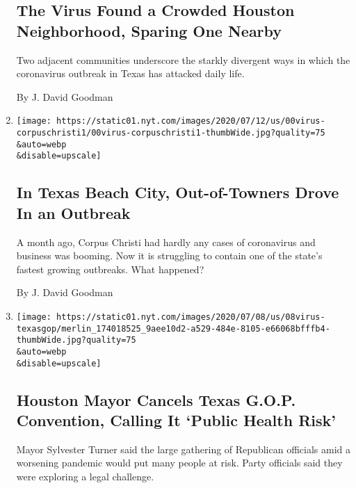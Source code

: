 \begin{enumerate}
  \hypertarget{the-virus-found-a-crowded-houston-neighborhood-sparing-one-nearby}{%
  \subsection{The Virus Found a Crowded Houston Neighborhood, Sparing
  One
  Nearby}\label{the-virus-found-a-crowded-houston-neighborhood-sparing-one-nearby}}

  Two adjacent communities underscore the starkly divergent ways in
  which the coronavirus outbreak in Texas has attacked daily life.

  By J. David Goodman
\item
  \href{/2020/07/11/us/coronavirus-texas-corpus-christi.html}{}

  \texttt{[image: https://static01.nyt.com/images/2020/07/12/us/00virus-corpuschristi1/00virus-corpuschristi1-thumbWide.jpg?quality=75\\\&auto=webp\\\&disable=upscale]}

  \hypertarget{in-texas-beach-city-out-of-towners-drove-in-an-outbreak}{%
  \subsection{In Texas Beach City, Out-of-Towners Drove In an
  Outbreak}\label{in-texas-beach-city-out-of-towners-drove-in-an-outbreak}}

  A month ago, Corpus Christi had hardly any cases of coronavirus and
  business was booming. Now it is struggling to contain one of the
  state's fastest growing outbreaks. What happened?

  By J. David Goodman
\item
  \href{/2020/07/08/us/coronavirus-texas-republican-convention-gop.html}{}

  \texttt{[image: https://static01.nyt.com/images/2020/07/08/us/08virus-texasgop/merlin\_174018525\_9aee10d2-a529-484e-8105-e66068bfffb4-thumbWide.jpg?quality=75\\\&auto=webp\\\&disable=upscale]}

  \hypertarget{houston-mayor-cancels-texas-gop-convention-calling-it-public-health-risk}{%
  \subsection{Houston Mayor Cancels Texas G.O.P. Convention, Calling It
  `Public Health
  Risk'}\label{houston-mayor-cancels-texas-gop-convention-calling-it-public-health-risk}}

  Mayor Sylvester Turner said the large gathering of Republican
  officials amid a worsening pandemic would put many people at risk.
  Party officials said they were exploring a legal challenge.


\end{enumerate}
